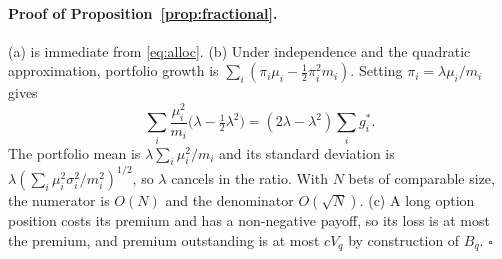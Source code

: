 \documentclass[11pt]{article}
\theoremstyle{definition}
\newcommand{\1}{\mathbf{1}}
\begin{document}
\paragraph{Proof of Proposition~\ref{prop:fractional}.}
(a) is immediate from \eqref{eq:alloc}. (b) Under independence and the quadratic
approximation, portfolio growth is $\sum_i(\pi_i\mu_i-\tfrac12\pi_i^2m_i)$. Setting
$\pi_i=\lambda\mu_i/m_i$ gives
\[
\sum_i\frac{\mu_i^2}{m_i}\Big(\lambda-\tfrac12\lambda^2\Big)=(2\lambda-\lambda^2)\sum_ig^\ast_i .
\]
The portfolio mean is $\lambda\sum_i\mu_i^2/m_i$ and its standard deviation is
$\lambda(\sum_i\mu_i^2\sigma_i^2/m_i^2)^{1/2}$, so $\lambda$ cancels in the ratio. With $N$
bets of comparable size, the numerator is $O(N)$ and the denominator $O(\sqrt N)$. (c) A long
option position costs its premium and has a non-negative payoff, so its loss is at most the
premium, and premium outstanding is at most $cV_q$ by construction of $B_q$. $\square$
\end{document}

